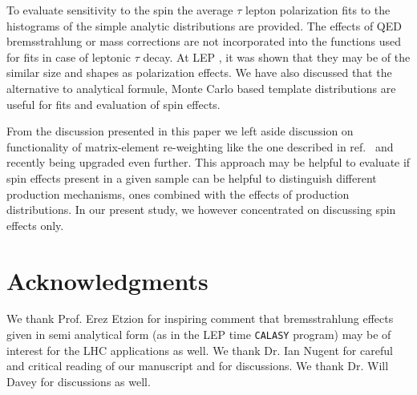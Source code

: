 \documentclass{article}
\begin{document}
To evaluate sensitivity to the spin the average $\tau$ lepton polarization fits to the histograms of the simple analytic
distributions are provided. 
The effects of QED bremsstrahlung or mass corrections are not  incorporated into the functions  used for fits in case 
of leptonic $\tau$ decay.
At LEP  \cite{Eberhard:1989ve}, it was shown
that they may be of the similar size and shapes as polarization effects.
We have also discussed that the alternative to analytical formule, Monte Carlo based template distributions are useful for fits
and evaluation of spin effects.

From the discussion presented in this paper we left aside discussion on functionality of matrix-element re-weighting
like the one described in ref.~\cite{Banerjee:2012ez} and recently being upgraded even further. 
This approach may be helpful to evaluate if spin effects
present in a given sample can be helpful to distinguish different production mechanisms, ones combined with the effects
of production distributions.
In our present study, we however concentrated on discussing spin effects only. 








\section*{Acknowledgments}
We thank Prof. Erez Etzion for inspiring comment that bremsstrahlung effects
 given in semi analytical 
form (as in the LEP time {\tt CALASY} program) may be of interest  for the LHC 
applications 
as well. We thank Dr. Ian Nugent for careful and critical reading of our manuscript and for discussions. We thank Dr. Will Davey for discussions as well. 
\end{document}
